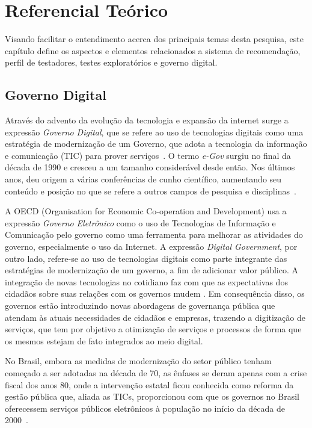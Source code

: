 \chapter[Referencial Teórico]{Referencial Teórico}
Visando facilitar o entendimento acerca dos principais temas desta pesquisa, este capítulo define os aspectos e elementos relacionados a sistema de
recomendação, perfil de testadores, testes exploratórios e governo digital.
\section{Governo Digital}

Através do advento da evolução da tecnologia e expansão da internet surge a expressão \textit{Governo Digital},
que se refere ao uso de tecnologias digitais como uma estratégia de modernização de um Governo, que adota a tecnologia
da informação e comunicação (TIC) para prover serviços~\cite{fang2002government}. O termo \textit{e-Gov} surgiu no final da década de 1990 e cresceu a um tamanho considerável desde então. Nos últimos
anos, deu origem a várias conferências de cunho científico, aumentando seu conteúdo e posição no que se refere a outros
campos de pesquisa e disciplinas~\cite{gronlund2005introducing}.

A OECD (Organisation for Economic Co-operation and Development) usa a expressão \textit {Governo Eletrônico} como o uso de Tecnologias de Informação e
Comunicação pelo governo como uma ferramenta para melhorar as atividades do governo, especialmente o uso da Internet. A expressão
\textit{Digital Government}, por outro lado, refere-se ao uso de tecnologias digitais como parte integrante das estratégias de modernização de um governo,
a fim de adicionar valor público. A integração de novas tecnologias no cotidiano faz com que as expectativas dos cidadãos sobre suas relações com os governos
mudem \cite{oecd}. Em consequência disso, os governos estão introduzindo novas abordagens de governança pública que atendam às atuais necessidades de
cidadãos e empresas, trazendo a digitização de serviços, que tem por objetivo a otimização de serviços e processos de forma que os mesmos estejam de fato
integrados ao meio digital.

No Brasil, embora as medidas de modernização do setor público tenham começado a ser adotadas na década de 70, as ênfases se deram apenas com a crise fiscal
dos anos 80, onde a intervenção estatal ficou conhecida como reforma da gestão pública que, aliada as TICs, proporcionou com que os governos no Brasil oferecessem
serviços públicos eletrônicos à população no início da década de 2000~\cite{przeybilovicz2015desenvolvimento}.

